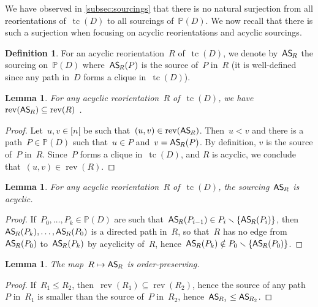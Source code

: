 \documentclass{amsart}
\newtheorem{lemma}[theorem]{Lemma}
\theoremstyle{definition}
\newtheorem{definition}[theorem]{Definition}
\newcommand{\ssm}{\smallsetminus} %
\DeclareMathOperator{\tc}{tc} %
\newcommand{\mymap}[2]{\mathsf{#1}_{\hspace{-.7pt}#2}}
\DeclareMathOperator{\rev}{rev} %
\newcommand{\asour}[1]{\mymap{AS}{#1}}  %
\newcommand{\PP}{\mathbb P} %
\begin{document}
We have observed in \cref{subsec:sourcings} that there is no natural surjection from all reorientations of~$\tc(D)$ to all sourcings of~$\PP(D)$.
We now recall that there is such a surjection when focusing on acyclic reorientations and acyclic sourcings.

\begin{definition}
\label{def:AReori2ASour}
For an acyclic reorientation~$R$ of~$\tc(D)$, we denote by~$\asour{R}$ the sourcing on~$\PP(D)$ where~$\asour{R}(P)$ is the source of~$P$ in~$R$ (it is well-defined since any path in~$D$ forms a clique in~$\tc(D)$).
\end{definition}

\begin{lemma}
\label{lem:AReori2ASour1}
For any acyclic reorientation~$R$ of~$\tc(D)$, we have~$\rev(\asour{R}) \subseteq \rev(R)$ .
\end{lemma}

\begin{proof}
Let~$u,v \in [n[$ be such that~$(u,v) \in \rev(\asour{R})$. 
Then~$u < v$ and there is a path~$P \in \PP(D)$ such that~$u \in P$ and~$v = \asour{R}(P)$.
By definition, $v$ is the source of~$P$ in~$R$.
Since~$P$ forms a clique in~$\tc(D)$, and $R$ is acyclic, we conclude that~$(u,v) \in \rev(R)$.
\end{proof}

\begin{lemma}
\label{lem:AReori2ASour2}
For any acyclic reorientation~$R$ of~$\tc(D)$, the sourcing~$\asour{R}$ is acyclic.
\end{lemma}

\begin{proof}
If~$P_0, \dots, P_k \in \PP(D)$ are such that~$\asour{R}(P_{i-1}) \in P_i \ssm \{\asour{R}(P_i)\}$, then~$\asour{R}(P_k), \dots, \asour{R}(P_0)$ is a directed path in~$R$, so that~$R$ has no edge from~$\asour{R}(P_0)$ to~$\asour{R}(P_k)$ by acyclicity of~$R$, hence~${\asour{R}(P_k) \notin P_0 \ssm \{\asour{R}(P_0)\}}$.
\end{proof}

\begin{lemma}
\label{lem:AReori2ASour3}
The map~$R \mapsto \asour{R}$ is order-preserving.
\end{lemma}

\begin{proof}
If~$R_1 \le R_2$, then~$\rev(R_1) \subseteq \rev(R_2)$, hence the source of any path~$P$ in~$R_1$ is smaller than the source of~$P$ in~$R_2$, hence~$\asour{R_1} \le \asour{R_2}$.
\end{proof}
\end{document}
